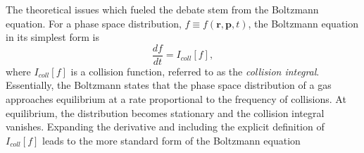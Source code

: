 \documentclass[%
 reprint,
 amsmath,amssymb,
 aps,
]{revtex4-1}
\begin{document}

The theoretical issues which fueled the debate stem from the Boltzmann equation. For a phase space distribution,  $f \equiv f\left(\mathbf{r},\mathbf{p},t\right)$, the Boltzmann equation in its simplest form is
\begin{equation}
\frac{df}{dt} = I_{coll}\left[f\right],
\end{equation}
where $I_{coll}\left[f\right]$ is a collision function, referred to as the \textit{collision integral}. Essentially, the Boltzmann states that the phase space distribution of a gas approaches equilibrium at a rate proportional to the frequency of collisions. At equilibrium, the distribution becomes stationary and the collision integral vanishes. Expanding the derivative and including the explicit definition of  $I_{coll}\left[f\right]$ leads to the more standard form of the Boltzmann equation

\end{document}
